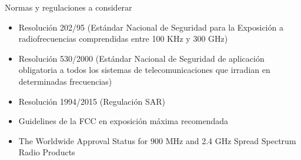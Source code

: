 Normas y regulaciones a considerar

\begin{itemize}
\item Resolución 202/95  (Estándar Nacional de Seguridad para la Exposición a radiofrecuencias comprendidas entre 100 KHz y 300 GHz)
\item Resolución 530/2000 (Estándar Nacional de Seguridad de aplicación obligatoria a todos los sistemas de telecomunicaciones que irradian en determinadas frecuencias)
\item Resolución 1994/2015 (Regulación SAR)
\item Guidelines de la FCC en exposición máxima recomendada
\item The Worldwide Approval Status for 900 MHz and 2.4 GHz Spread
Spectrum Radio Products
\end{itemize}









